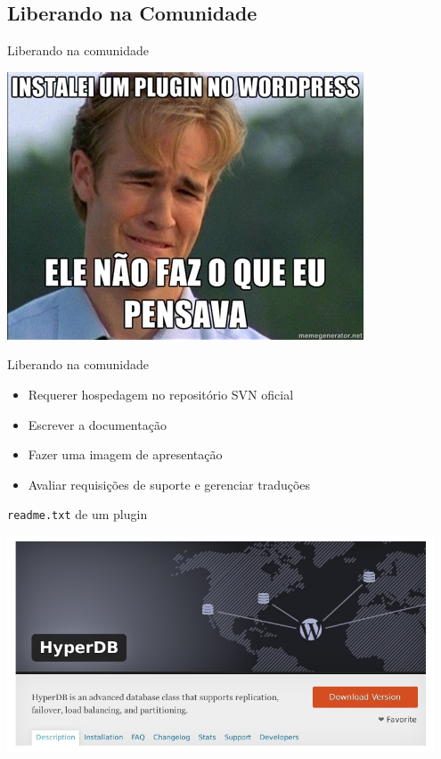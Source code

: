 \documentclass{beamer}
\begin{document}
\subsection{Liberando na Comunidade}

\begin{frame}{Liberando na comunidade}
\begin{center}
  \includegraphics[height=0.8\textheight]{./img/plugins-install.jpg}
\end{center}
\end{frame}

\begin{frame}{Liberando na comunidade}
\begin{itemize}
  \pause \item Requerer hospedagem no repositório SVN oficial
  \pause \item Escrever a documentação
  \pause \item Fazer uma imagem de apresentação
  \pause \item Avaliar requisições de suporte e gerenciar traduções
\end{itemize}
\end{frame}

\begin{frame}{\texttt{readme.txt} de um plugin}
  
\end{frame}

\begin{frame}
\begin{center}
  \includegraphics[width=0.95\textwidth]{./img/hyperdb-screen.jpg}
\end{center}
\end{frame}
\end{document}
